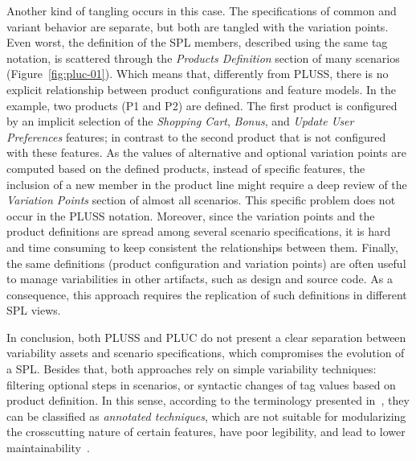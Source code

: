 \documentclass{acm_proc_article-sp}
\begin{document}
Another kind of tangling occurs in this case. The specifications of common and
variant behavior are separate, but both are tangled with the variation points.
{\color{red}Even worst}, the definition of the SPL members, described using the
same tag notation,  {\color{red} is scattered through the \emph{Products
Definition} section of many scenarios (Figure~\ref{fig:pluc-01})}.
{\color{red} Which means that, differently from PLUSS}, there is no explicit
relationship between product configurations and feature models. In the example, two products (P1 and P2) are defined. The first product is configured by an implicit selection of the \emph{Shopping Cart}, \emph{Bonus}, and \emph{Update
User Preferences} features; in contrast to the second product that is not
configured with these features. As the values of alternative and optional
variation points are computed based on the defined products, instead of specific
features, the inclusion of a new member in the product line might require a deep
review of the \emph{Variation Points} section of {\color{red}almost all}
scenarios. {\color{red}This specific problem does not occur in the PLUSS notation}. Moreover, since the
variation points and the product definitions are spread among several scenario
specifications, it is hard and time consuming to keep consistent the
relationships between them. Finally, the same definitions (product configuration
and variation points) are often useful to manage variabilities in other
artifacts, such as design and source code. As a consequence, this approach
requires the replication of such definitions in different SPL views.

In conclusion, both PLUSS and PLUC do not present a clear separation between
variability assets and scenario specifications, which compromises the
evolution of a SPL. Besides that, both approaches rely on simple
variability techniques: filtering optional steps in scenarios, or syntactic
changes of tag values based on product definition. In this sense, according to the terminology
presented in~\cite{Kastner:2008aa}, they can be classified as \emph{annotated
techniques}, which are not suitable for modularizing the crosscutting nature of certain
features, have poor legibility, and lead to lower
maintainability~\cite{Alves:2006aa,Kastner:2008aa}.

\end{document}
